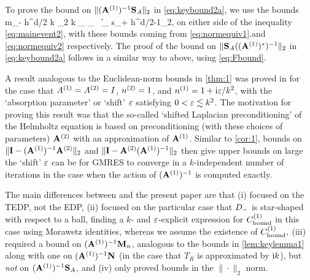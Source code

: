 To prove the bound on  $\|(\mathbf{A}^{(1)})^{-1}\mathbf{S}_A\|_{2}$ in \cref{eq:keybound2a}, we use the bounds 
\beqs
m_- h^{d/2} k \N{\tbu}_2 \leq k _{\LtDR} \leq {}_{\HokDR}
\,\tand\,
\big\|\nabla {}\big\|_{\LtDR} \leq s_+ h^{d/2-1}\N{\bff}_2,
\eeqs
on either side of the inequality \cref{eq:mainevent2}, with these bounds coming from \cref{eq:normequiv1}.and \cref{eq:normequiv2} respectively. The proof of the bound on 
$\|\mathbf{S}_A((\mathbf{A}^{(1)})^*)^{-1}\|_{2}$ in \cref{eq:keybound2a} follows in a similar way to above, using \cref{eq:Fbound}.
\epf

A result analogous to the Euclidean-norm bounds in \cref{thm:1} was proved in \cite{GaGrSp:15} for the case that ${A}^{(1)}= {A}^{(2)}= I$, ${n}^{(2)}= 1$, and ${n}^{(1)} = 1 + \mathrm{i}\varepsilon/k^2$, with the `absorption parameter' or `shift' $\varepsilon$ satisfying $0<\varepsilon\lesssim k^2$. The motivation for proving this result was that the so-called `shifted Laplacian preconditioning' of the Helmholtz equation is based on preconditioning (with these choices of parameters) $\mathbf{A}^{(2)}$ with an approximation of $\mathbf{A}^{(1)}$. Similar to \cref{cor:1}, bounds on $\|\mathbf{I} -  (\mathbf{A}^{(1)})^{-1}\mathbf{A}^{(2)} \|_2$ and 
$\|\mathbf{I} - \mathbf{A}^{(2)}  (\mathbf{A}^{(1)})^{-1}\|_2$
 then give upper bounds on large the `shift' $\varepsilon$ can be for GMRES to converge in a $k$-independent number of iterations in the case when the action of $(\mathbf{A}^{(1)})^{-1}$ is computed exactly.

The main differences between \cite{GaGrSp:15} and the present paper are that (i)  \cite{GaGrSp:15} focused on the TEDP, not the EDP,
(ii) \cite{GaGrSp:15} focused on the particular case that $D_{-}$ is star-shaped with respect to a ball, finding a $k$- and $\varepsilon$-explicit expression for $C^{(1)}_{\rm bound}$ in this case using Morawetz identities, whereas we assume the existence of $C_{\mathrm{bound}}^{(1)},$
(iii) \cite{GaGrSp:15} required a bound on 
$(\mathbf{A}^{(1)})^{-1}\mathbf{M}_{n}$, analogous to the bounds in \cref{lem:keylemma1} along with one on $(\mathbf{A}^{(1)})^{-1}\mathbf{N}$ (in the case that $T_R$ is approximated by $\mathrm{i} k$), but \emph{not} on 
$(\mathbf{A}^{(1)})^{-1}\mathbf{S}_{A}$, and (iv) \cite{GaGrSp:15} only proved bounds in the $\|\cdot\|_2$ norm.
\ere


